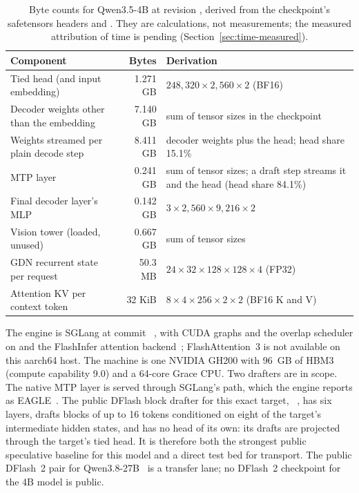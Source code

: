 \begin{table}[tbp]
\small\centering
\begin{tabularx}{\linewidth}{@{}P{5.9cm}rY@{}}\toprule
Component & Bytes & Derivation\\\midrule
Tied head (and input embedding) & 1.271 GB & $248{,}320\times2{,}560\times2$ (BF16)\\
Decoder weights other than the embedding & 7.140 GB & sum of tensor sizes in the checkpoint\\
Weights streamed per plain decode step & 8.411 GB & decoder weights plus the head; head share 15.1\%\\
MTP layer & 0.241 GB & sum of tensor sizes; a draft step streams it and the head (head share 84.1\%)\\
Final decoder layer's MLP & 0.142 GB & $3\times2{,}560\times9{,}216\times2$\\
Vision tower (loaded, unused) & 0.667 GB & sum of tensor sizes\\
GDN recurrent state per request & 50.3 MB & $24\times32\times128\times128\times4$ (FP32)\\
Attention KV per context token & 32 KiB & $8\times4\times256\times2\times2$ (BF16 K and V)\\\bottomrule
\end{tabularx}
\caption{Byte counts for Qwen3.5-4B at revision \modelpin, derived from the checkpoint's safetensors headers and . They are calculations, not measurements; the measured attribution of time is pending (Section~\ref{sec:time-measured}).}
\label{tab:bytes}
\end{table}

The engine is SGLang at commit \sourcepin~\cite{sglangpaper}, with CUDA graphs and the overlap scheduler on and the FlashInfer attention backend~\cite{flashinfer}; FlashAttention~3 is not available on this aarch64 host. The machine is one NVIDIA GH200 with 96~GB of HBM3 (compute capability 9.0) and a 64-core Grace CPU. Two drafters are in scope. The native MTP layer is served through SGLang's  path, which the engine reports as EAGLE~\cite{eagle}. The public DFlash block drafter for this exact target, ~\cite{dflashpaper,dflash4bcard}, has six layers, drafts blocks of up to 16 tokens conditioned on eight of the target's intermediate hidden states, and has no head of its own: its drafts are projected through the target's tied head. It is therefore both the strongest public speculative baseline for this model and a direct test bed for transport. The public DFlash~2 pair for Qwen3.8-27B~\cite{dflash,dflashcard} is a transfer lane; no DFlash~2 checkpoint for the 4B model is public.

